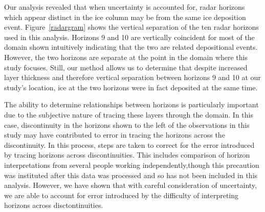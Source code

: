 \documentclass[12pt]{article}
\begin{document}
Our analysis revealed that when uncertainty is accounted for, radar horizons which appear distinct in the ice column may be from the same ice deposition event. Figure~\ref{radargram} shows the vertical separation of the ten radar horizons used in this analysis. Horizons 9 and 10 are vertically coincident for most of the domain shown  intuitively indicating that the two are related depositional events. However, the two horizons are separate at the point in the domain where this study focuses. Still, our method allows us to determine that despite increased layer thickness and therefore vertical separation between horizons 9 and 10 at our study's location, ice at the two horizons were in fact deposited at the same time.

The ability to determine relationships between horizons is particularly important due to the subjective nature of tracing these layers through the domain. In this case, discontinuity in the horizons shown to the left of the observations in this study may have contributed to error in tracing the horizons across the discontinuity. In this process, steps are taken to correct for the  error introduced by tracing horizons across discontinuities. This includes comparison of horizon interpretations from several people working independently,though this precaution was instituted after this data was processed and so has not been included in this analysis. However, we have shown that with careful consideration of uncertainty, we are able to account for error introduced by the difficulty of interpreting horizons across disctontinuities.




\end{document}
